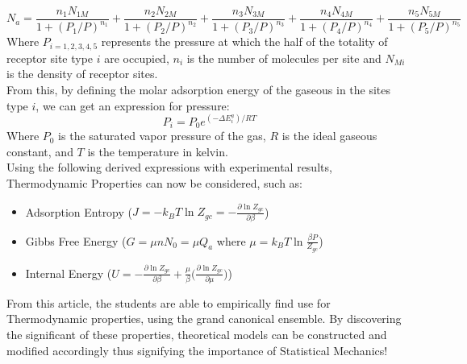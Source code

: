 \documentclass[12pt,a4paper]{article}
\begin{document}
\begin{enumerate}
    \[N_a = \frac{n_1N_{1M}}{1+(P_1/P)^{n_1}} + \frac{n_2N_{2M}}{1+(P_2/P)^{n_2}} + \frac{n_3N_{3M}}{1+(P_3/P)^{n_3}} + \frac{n_4N_{4M}}{1+(P_4/P)^{n_4}} + \frac{n_5N_{5M}}{1+(P_5/P)^{n_5}}\]
	Where $P_{i = 1,2,3,4,5}$ represents the pressure at which the half of the totality of receptor site type $i$ are occupied, $n_i$ is the number of molecules per site and $N_{Mi}$ is the density of receptor sites.\\
	\newpage
	From this, by defining the molar adsorption energy of the gaseous in the sites type $i$, we can get an expression for pressure:
	\[P_i = P_0e^{(-\Delta E_i^a)/RT}\]
	Where $P_0$ is the saturated vapor pressure of the gas, $R$ is the ideal gaseous constant, and $T$ is the temperature in kelvin.\\

	Using the following derived expressions with experimental results, Thermodynamic Properties can now be considered, such as:
	
	\begin{itemize}
		\item Adsorption Entropy ($J = -k_BT\ln Z_{gc} = -\frac{\partial\ln Z_{gc}}{\partial\beta}$)
		\item Gibbs Free Energy ($G = \mu nN_0 = \mu Q_a$ where $\mu = k_BT\ln\frac{\beta P}{Z_{gc}}$)
		\item Internal Energy ($U = -\frac{\partial\ln Z_{gc}}{\partial\beta} + \frac{\mu}{\beta}\big(\frac{\partial\ln Z_{gc}}{\partial\mu}\big)$)
	\end{itemize}
    From this article, the students are able to empirically find use for Thermodynamic properties, using the grand canonical ensemble. By discovering the significant of these properties, theoretical models can be constructed and modified accordingly thus signifying the importance of Statistical Mechanics!
\end{enumerate}
\end{document}
